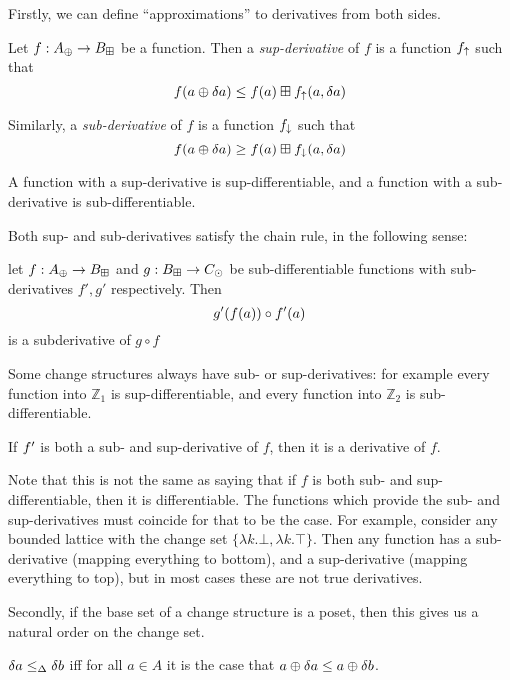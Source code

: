Firstly, we can define ``approximations'' to derivatives from both sides.

\begin{defn}
  Let $f: A_\oplus \rightarrow B_\boxplus$ be a function. Then a \textit{sup-derivative}
  of $f$ is a function $f_\uparrow$ such that
  $$f(a \oplus \delta a) \leq f(a) \boxplus f_\uparrow(a, \delta a)$$
  
  Similarly, a \textit{sub-derivative} of $f$ is a function $f_\downarrow$ such that 
  $$f(a \oplus \delta a) \geq f(a) \boxplus f_\downarrow(a, \delta a)$$

  A function with a sup-derivative is sup-differentiable, and a function with a
  sub-derivative is sub-differentiable.
\end{defn}

Both sup- and sub-derivatives satisfy the chain rule, in the following sense: 
\begin{prop}
  let $f : A_\oplus \rightarrow B_\boxplus$ and $g : B_\boxplus \rightarrow C_\odot$ be
  sub-differentiable functions with sub-derivatives $f', g'$ respectively. Then
  $$g'(f(a)) \circ f'(a)$$ is a subderivative of $g \circ f$
\end{prop}

Some change structures always have sub- or sup-derivatives: for example every function
into $\mathbb{Z}_1$ is sup-differentiable, and every function into $\mathbb{Z}_2$ is 
sub-differentiable.

\begin{prop}
  If $f'$ is both a sub- and sup-derivative of $f$, then it is a derivative of $f$.
\end{prop}

Note that this is not the same as saying that if $f$ is both sub- and
sup-differentiable, then it is differentiable. The functions which provide the
sub- and sup-derivatives must coincide for that to be the case. For example,
consider any bounded lattice with the change set $\{ \lambda k . \bot, \lambda k
 . \top \}$. Then any function has a sub-derivative (mapping everything to
 bottom), and a sup-derivative (mapping everything to top), but in most cases
 these are not true derivatives.

Secondly, if the base set of a change structure is a poset, then this gives us a natural
order on the change set.

\begin{defn}
  $\delta a \leq_\Delta \delta b$ iff for all $a \in A$ it is the case that $a \oplus \delta a \leq a \oplus \delta b$.
\end{defn}

